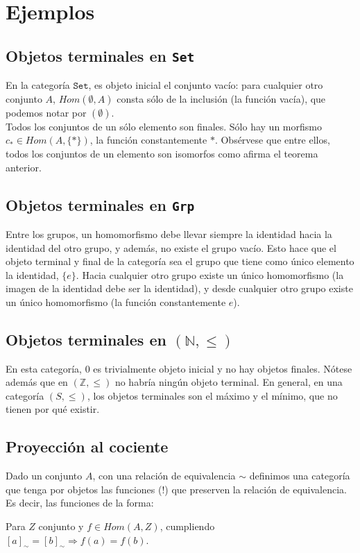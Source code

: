 \documentclass[11pt, fleqn, spanish]{book}
\begin{document}
  \section {Ejemplos}
    \subsection {Objetos terminales en \texttt{Set}}
      En la categoría $\mathtt{Set}$, es objeto inicial el conjunto vacío: para cualquier otro
      conjunto $A$, $Hom(\emptyset, A)$ consta sólo de la inclusión (la función vacía), que 
      podemos notar por $(\emptyset)$. \\
      Todos los conjuntos de un sólo elemento son finales. Sólo hay un morfismo $c_\ast \in Hom(A,\{\ast\})$,
      la función constantemente $\ast$. Obsérvese que entre ellos, todos los conjuntos de un elemento
      son isomorfos como afirma el teorema anterior.
    
    \subsection {Objetos terminales en \texttt{Grp}}
      Entre los grupos, un homomorfismo debe llevar siempre la identidad hacia la identidad
      del otro grupo, y además, no existe el grupo vacío. Esto hace que el objeto terminal
      y final de la categoría sea el grupo que tiene como único elemento la identidad, $\{e\}$.
      Hacia cualquier otro grupo existe un único homomorfismo (la imagen de la identidad debe ser
      la identidad), y desde cualquier otro grupo existe un único homomorfismo (la función 
      constantemente $e$).
    
    \subsection {Objetos terminales en $(\mathbb{N},\leq)$}
      En esta categoría, $0$ es trivialmente objeto inicial y no hay objetos finales.
      Nótese además que en $(\mathbb{Z},\leq)$ no habría ningún objeto terminal. En general,
      en una categoría $(S,\leq)$, los objetos terminales son el máximo y el mínimo, que
      no tienen por qué existir.
    
    \subsection {Proyección al cociente}
      Dado un conjunto $A$, con una relación de equivalencia $\sim$ definimos una categoría
      que tenga por objetos las funciones (!) que preserven la relación de equivalencia.
      Es decir, las funciones de la forma:
      \begin{center}
      \end{center}
      Para $Z$ conjunto y $f \in Hom(A,Z)$, cumpliendo $[a]_{\sim} = [b]_{\sim} \Rightarrow f(a) = f(b)$.
      
\end{document}
